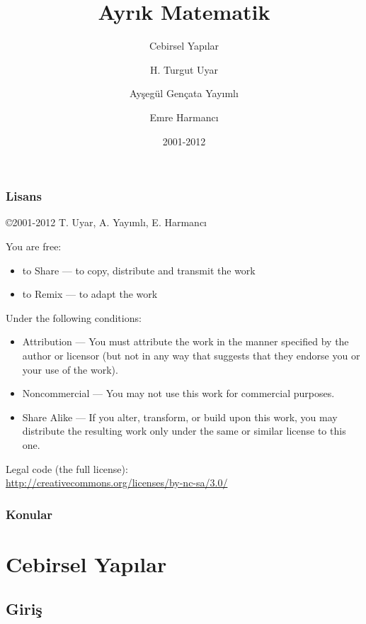 \documentclass[dvipsnames]{beamer}
\title{Ayrık Matematik}
\subtitle{Cebirsel Yapılar}
\author{H. Turgut Uyar \and Ayşegül Gençata Yayımlı \and Emre Harmancı}
\date{2001-2012}
\theoremstyle{definition}
\theoremstyle{example}
\theoremstyle{plain}
\begin{document}
\begin{frame}
  \titlepage
\end{frame}

\begin{frame}
  \frametitle{Lisans}

  \hfill
  \copyright 2001-2012 T. Uyar, A. Yayımlı, E. Harmancı

  \vfill
  \begin{tiny}
    You are free:
    \begin{itemize}
      \item to Share — to copy, distribute and transmit the work
      \item to Remix — to adapt the work
    \end{itemize}

    Under the following conditions:
    \begin{itemize}
      \item Attribution — You must attribute the work in the manner specified by
        the author or licensor (but not in any way that suggests that they
        endorse you or your use of the work).

      \item Noncommercial — You may not use this work for commercial purposes.

      \item Share Alike — If you alter, transform, or build upon this work, you
        may distribute the resulting work only under the same or similar license
        to this one.
    \end{itemize}
  \end{tiny}

  \vfill
  Legal code (the full license):\\
  \url{http://creativecommons.org/licenses/by-nc-sa/3.0/}
\end{frame}

\begin{frame}
  \frametitle{Konular}
  \tableofcontents
\end{frame}

\section{Cebirsel Yapılar}

\subsection{Giriş}
\end{document}
